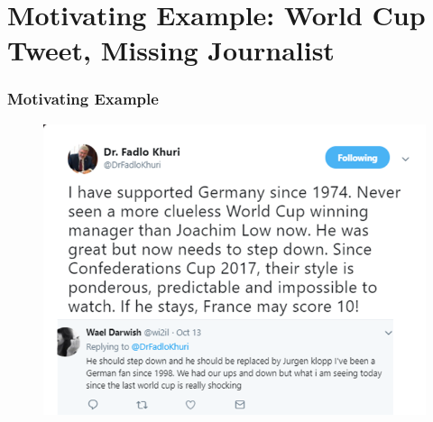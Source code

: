 \documentclass[xcolor=table]{beamer}
\begin{document}
\section{Motivating Example: World Cup Tweet, Missing Journalist}
\begin{frame}
\frametitle{Motivating Example}
\begin{figure}[!htb]
   \centering
    \includegraphics[scale=0.5]{img0004.png}
    
\end{figure}

\end{frame}

\end{document}
